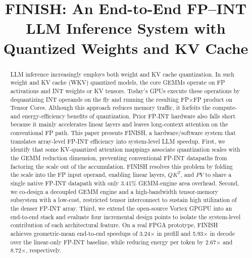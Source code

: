 \documentclass[sigconf,anonymous,nonacm]{acmart}
\title[FINISH: An End-to-End FP--INT LLM Inference System]{FINISH: An End-to-End FP–INT LLM Inference System with Quantized Weights and KV Cache}
\newcommand{\ours}{\textsc{FINISH}}
\newcommand{\fpint}{FP-INT}
\begin{document}
\begin{abstract}
LLM inference increasingly employs both weight and KV cache quantization. In such weight and KV cache (WKV) quantized models, the core GEMMs operate on FP activations and INT weights or KV tensors. Today's GPUs execute these operations by dequantizing INT operands on the fly and running the resulting FP$\times$FP product on Tensor Cores. Although this approach reduces memory traffic, it forfeits the compute- and energy-efficiency benefits of quantization. Prior \fpint{} hardware also falls short because it mainly accelerates linear layers and leaves long-context attention on the conventional FP path.
This paper presents \ours{}, a hardware/software system that translates array-level \fpint{} efficiency into system-level LLM speedup. 
First, we identify that some KV-quantized attention mappings associate quantization scales with the GEMM reduction dimension, preventing conventional \fpint{} datapaths from factoring the scale out of the accumulation. \ours{} resolves this problem by folding the scale into the FP input operand, enabling linear layers, $QK^T$, and $PV$ to share a single native \fpint{} datapath with only 3.41\% GEMM-engine area overhead. 
Second, we co-design a decoupled GEMM engine and a high-bandwidth tensor-memory subsystem with a low-cost, restricted tensor interconnect to sustain high utilization of the denser \fpint{} array.
Third, we extend the open-source Vortex GPGPU into an end-to-end stack and evaluate four incremental design points to isolate the system-level contribution of each architectural feature. On a real FPGA prototype, \ours{} achieves geometric-mean end-to-end speedups of 3.24$\times$ in prefill and 5.93$\times$ in decode over the linear-only \fpint{} baseline, while reducing energy per token by 2.67$\times$ and 8.72$\times$, respectively.


\end{abstract}
\end{document}
